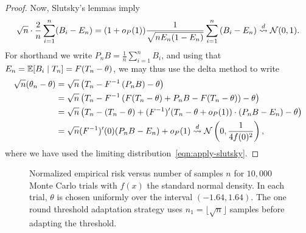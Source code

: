 \begin{proof}
  Now,
  Slutsky's lemmas imply
  \begin{equation}
    \sqrt{n}
    \cdot \frac{2}{n} \sum_{i = 1}^n (B_i - E_n)
    =
    (1 + o_P(1)) \frac{1}{\sqrt{n E_n(1 - E_n)}}
    \sum_{i = 1}^n \left(B_i - E_n\right)
    \stackrel{d}{\rightsquigarrow} \mathcal{N}(0, 1).
    \label{eqn:apply-slutsky}
  \end{equation}
  For shorthand we write $P_n B = \frac{1}{n} \sum_{i = 1}^n B_i$,
  and using that $E_n = \mathbb{E}[B_i \mid T_n] = F(T_n - \theta)$, we may thus
  use the delta method to write
  \begin{align*}
    \sqrt{n}(\theta_n - \theta)
    & = \sqrt{n}\left(T_n - F^{-1}\left(P_n B\right)
    - \theta \right) \\
    & = \sqrt{n} \left(T_n - F^{-1}\left(F(T_n - \theta)
    + P_n B - F(T_n - \theta)\right) - \theta \right) \\
    & = \sqrt{n} \left(T_n - (T_n - \theta )
    + (F^{-1})'(T_n - \theta + o_P(1))\cdot \left(
    P_n B - E_n\right) - \theta \right) \\
    & = \sqrt{n} (F^{-1})'(0) (P_n B - E_n)
    + o_P(1)
    \stackrel{d}{\rightsquigarrow} \mathcal{N}\left(0, \frac{1}{4 f(0)^2}\right),
  \end{align*}
  where we have used the limiting distribution~\eqref{eqn:apply-slutsky}.
\end{proof}
%

\begin{figure}
\begin{center}
\caption{Normalized empirical risk versus number of samples $n$ for $10,000$ Monte Carlo trials with $f(x)$ the standard normal density. In each trial, $\theta$ is chosen uniformly over the interval $(-1.64,1.64)$. The one round threshold adaptation strategy uses $n_1 = \lfloor \sqrt{n} \rfloor$ samples before adapting the threshold.
\label{fig:adaptive_error}  }
\end{center}
\end{figure}
